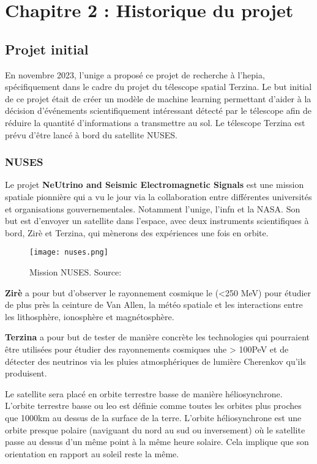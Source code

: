 \chapter{Chapitre 2 : Historique du projet}

\section{Projet initial}

En novembre 2023, l'\gls{unige} a proposé ce projet de recherche à l'\gls{hepia}, spécifiquement dans le cadre du projet du télescope spatial Terzina. 
Le but initial de ce projet était de créer un modèle de machine learning permettant d'aider à la décision d'événements scientifiquement intéressant 
détecté par le télescope afin de réduire la quantité d'informations a transmettre au sol. 
Le télescope Terzina est prévu d'être lancé à bord du satellite NUSES.

\subsection{NUSES}
Le projet \textbf{NeUtrino and Seismic Electromagnetic Signals} est une mission spatiale pionnière qui 
a vu le jour via la collaboration entre différentes universités et organisations gouvernementales. \cite{Nuses}
Notamment l'\gls{unige}, l'\gls{infn} et la NASA.
Son but est d'envoyer un satellite dans l'espace, avec deux instruments scientifiques à bord, Zirè et Terzina, qui mènerons 
des expériences une fois en orbite.

\begin{figure}[tbph!]
	\centering
	\texttt{[image: nuses.png]}
	\caption[Mission NUSES]{Mission NUSES. Source: \cite{Nuses}}
\end{figure}

\textbf{Zirè} a pour but d'observer le rayonnement cosmique \gls{le} (<250 MeV) pour étudier de plus près la ceinture de Van Allen,
la météo spatiale et les interactions entre les lithosphère, ionosphère et magnétosphère.

\textbf{Terzina} a pour but de tester de manière concrète les technologies qui pourraient être utilisées pour étudier des rayonnements cosmiques
\gls{uhe} > 100PeV et de détecter des neutrinos via les pluies atmosphériques de lumière Cherenkov qu'ils produisent.


Le satellite sera placé en orbite terrestre basse de manière héliosynchrone.
L'orbite terrestre basse ou \gls{leo} est définie comme toutes les orbites plus proches que 1000km au dessus de la surface de la terre.\cite{LowEarthOrbit}
L'orbite héliosynchrone est une orbite presque polaire (naviguant du nord au sud ou inversement) où le satellite 
passe au dessus d'un même point à la même heure solaire. Cela implique que son orientation en rapport au soleil reste la même.

